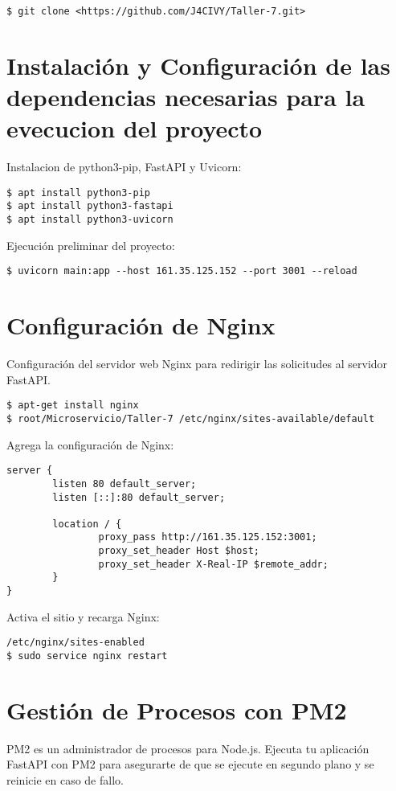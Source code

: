 \documentclass[journal, spanish]{IEEEtran}
\begin{document}
\begin{lstlisting}
$ git clone <https://github.com/J4CIVY/Taller-7.git>
\end{lstlisting}

\section{Instalación y Configuración de las dependencias necesarias para la evecucion del proyecto}

Instalacion de python3-pip,  FastAPI y Uvicorn:

\begin{lstlisting}
$ apt install python3-pip
$ apt install python3-fastapi
$ apt install python3-uvicorn
\end{lstlisting}

Ejecución preliminar del proyecto:

\begin{lstlisting}
$ uvicorn main:app --host 161.35.125.152 --port 3001 --reload
\end{lstlisting}

\section{Configuración de Nginx}
Configuración del servidor web Nginx para redirigir las solicitudes al servidor FastAPI.

\begin{lstlisting}
$ apt-get install nginx
$ root/Microservicio/Taller-7 /etc/nginx/sites-available/default
\end{lstlisting}

Agrega la configuración de Nginx:

\begin{lstlisting}
server {
        listen 80 default_server;
        listen [::]:80 default_server;

        location / {
                proxy_pass http://161.35.125.152:3001;
                proxy_set_header Host $host;
                proxy_set_header X-Real-IP $remote_addr;
        }
}
\end{lstlisting}

Activa el sitio y recarga Nginx:

\begin{lstlisting}
/etc/nginx/sites-enabled
$ sudo service nginx restart
\end{lstlisting}

\section{Gestión de Procesos con PM2}
PM2 es un administrador de procesos para Node.js. Ejecuta tu aplicación FastAPI con PM2 para asegurarte de que se ejecute en segundo plano y se reinicie en caso de fallo.
\end{document}
